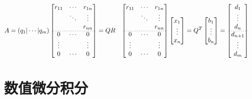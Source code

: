 \documentclass[twocolumn]{article}
\begin{document}
\begin{align*}
    A=(q_1|\cdots|q_m)
    \begin{bmatrix}
        r_{11} & \cdots & r_{1n} \\
               & \ddots & \vdots \\
               &        & r_{nn} \\
        \cdashline{1-3}[0.8pt/2pt]
        0      & \cdots & 0      \\
        \vdots &        & \vdots \\
        0      & \cdots & 0
    \end{bmatrix}
     & =QR
     &
    \begin{bmatrix}
        r_{11} & \cdots & r_{1n} \\
               & \ddots & \vdots \\
               &        & r_{nn} \\
        \cdashline{1-3}[0.8pt/2pt]
        0      & \cdots & 0      \\
        \vdots &        & \vdots \\
        0      & \cdots & 0
    \end{bmatrix}
    \begin{bmatrix}
        x_1    \\
        \vdots \\
        x_n
    \end{bmatrix}
     & =Q^T
    \begin{bmatrix}
        b_1    \\
        \vdots \\
        b_n
    \end{bmatrix}
    =
    \begin{bmatrix}
        d_1     \\
        \vdots  \\
        d_n     \\
        \cdashline{1-1}[0.8pt/2pt]
        d_{n+1} \\
        \vdots  \\
        d_m
    \end{bmatrix}
\end{align*}

\section{数值微分积分}
\end{document}
